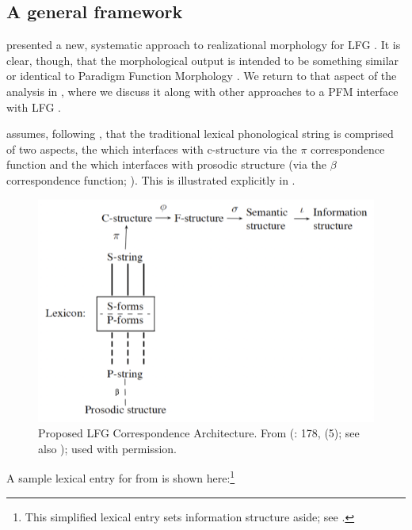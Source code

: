 \documentclass[output=paper,hidelinks]{langscibook}
\begin{document}
\subsection{A general framework}
\label{sec:Morph:general-framework}

\citet{dalrymple15} presented a new, systematic approach to realizational
morphology for LFG \citep[see also][ch.\,12]{DLM:LFG}. It is clear,
though, that the morphological output is intended to be something
similar or identical to Paradigm Function Morphology
\citep{Stu01,stump16}. We return to that aspect of the
\citeauthor{dalrymple15} analysis in , where we
discuss it along with other approaches to a PFM interface with LFG
\citep{ackerman;stump04,sadler-nordlinger2004,spencer13,thomas21}.

\citet{dalrymple15} assumes, following
\citet{DM11,MycockLowe2013}, that the traditional
lexical phonological string is comprised of two aspects, the 
which interfaces with c-structure via the $\pi$ correspondence
function and the  which interfaces with prosodic
structure (via the $\beta$ correspondence function; \citealt[409]{DLM:LFG}). This is
illustrated explicitly in .    

\begin{figure}
  \centering
  \includegraphics[scale=.5]{figures/Morphology/Dal-My-5.png}
  \caption{Proposed LFG Correspondence Architecture. From
    \citeauthor{DM11} (\citeyear{DM11}:
    178, (5); see also \citealt[409]{DLM:LFG}); used with permission.}
  \label{fig:Dal-My-5}
\end{figure}
%
A sample lexical entry for  from \citet[67,~(3)]{dalrymple15} is shown
here:\footnote{This simplified lexical entry sets information
  structure aside; see \citet[66]{dalrymple15}.}
\end{document}
